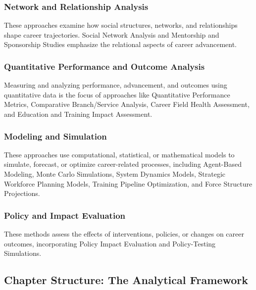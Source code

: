 \documentclass[./main.tex]{subfiles}
\begin{document}
\subsubsection{Network and Relationship
Analysis}\label{network-and-relationship-analysis}

These approaches examine how social structures, networks, and
relationships shape career trajectories. Social Network Analysis and
Mentorship and Sponsorship Studies emphasize the relational aspects of
career advancement.

\subsubsection{Quantitative Performance and Outcome
Analysis}\label{quantitative-performance-and-outcome-analysis}

Measuring and analyzing performance, advancement, and outcomes using
quantitative data is the focus of approaches like Quantitative
Performance Metrics, Comparative Branch/Service Analysis, Career Field
Health Assessment, and Education and Training Impact Assessment.

\subsubsection{Modeling and Simulation}\label{modeling-and-simulation}

These approaches use computational, statistical, or mathematical models
to simulate, forecast, or optimize career-related processes, including
Agent-Based Modeling, Monte Carlo Simulations, System Dynamics Models,
Strategic Workforce Planning Models, Training Pipeline Optimization, and
Force Structure Projections.

\subsubsection{Policy and Impact
Evaluation}\label{policy-and-impact-evaluation}

These methods assess the effects of interventions, policies, or changes
on career outcomes, incorporating Policy Impact Evaluation and
Policy-Testing Simulations.

\subsection{Chapter Structure: The Analytical
Framework}\label{chapter-structure-the-analytical-framework}
\end{document}
